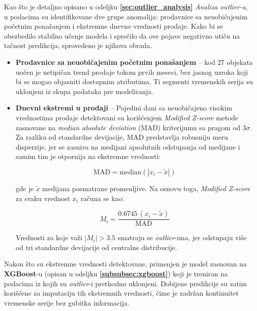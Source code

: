 \documentclass[12pt]{article}
\begin{document}
Kao što je detaljno opisano u odeljku \textbf{\ref{sec:outlier_analysis}} \textit{Analiza outlier-a}, u podacima su identifikovane dve grupe anomalija: prodavnice sa neuobičajenim početnim ponašanjem i ekstremne dnevne vrednosti prodaje.  
Kako bi se obezbedilo stabilno učenje modela i sprečilo da ove pojave negativno utiču na tačnost predikcija, sprovedeno je njihova obrada.

\begin{itemize}
    \item \textbf{Prodavnice sa neuobičajenim početnim ponašanjem} – kod 27 objekata uočen je netipičan trend prodaje tokom prvih meseci, bez jasnog uzroka koji bi se mogao objasniti dostupnim atributima. Ti segmenti vremenskih serija su uklonjeni iz skupa podataka pre modeliranja.
    
    \item \textbf{Dnevni ekstremi u prodaji} – Pojedini dani sa neuobičajeno visokim vrednostima prodaje detektovani su korišćenjem \textit{Modified Z-score} metode zasnovane na \textit{median absolute deviation} (MAD) kriterijumu sa pragom od \(3\sigma\).  
Za razliku od standardne devijacije, MAD predstavlja robusniju meru disperzije, jer se zasniva na medijani apsolutnih odstupanja od medijane i samim tim je otpornija na ekstremne vrednosti:

\begin{equation}
    \text{MAD} = \text{median}\left( |x_i - \tilde{x}| \right)
\end{equation}

gde je \(\tilde{x}\) medijana posmatrane promenljive.  
Na osnovu toga, \textit{Modified Z-score} za svaku vrednost \(x_i\) računa se kao:

\begin{equation}
    M_i = \frac{0.6745 \, (x_i - \tilde{x})}{\text{MAD}}
\end{equation}

Vrednosti za koje važi \(|M_i| > 3.5\) smatraju se \textit{outlier}-ima, jer odstupaju više od tri standardne devijacije od centralne distribucije.

\end{itemize}

Nakon što su ekstremne vrednosti detektovane, primenjen je model zasnovan na \textbf{XGBoost}-u (opisan u odeljku \textbf{\ref{subsubsec:xgboost}}) koji je treniran na podacima iz kojih su \textit{outlier}-i prethodno uklonjeni.  
Dobijene predikcije su zatim korišćene za imputaciju tih ekstremnih vrednosti, čime je zadržan kontinuitet vremenske serije bez gubitka informacija.  
\end{document}
